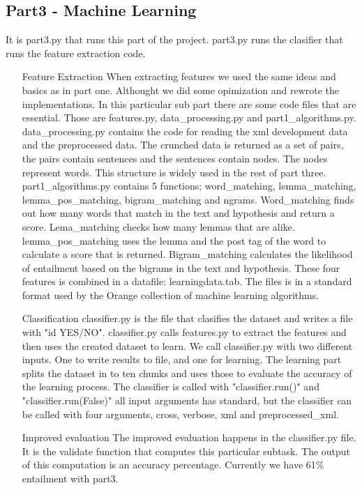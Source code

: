 \documentclass[titlepage]{article}
\begin{document}
\subsection{Part3 - Machine Learning}
It is part3.py that runs this part of the project. part3.py runs the clasifier that runs the feature extraction code. 
    \begin{itemize}
        \item[Feature Extraction] 
When extracting features we used the same ideas and basics as in part one. Althought we did some opimization and rewrote the implementations. In this particular sub part there are some code files that are essential. Those are features.py, data\_processing.py and part1\_algorithms.py. data\_processing.py contains the code for reading the xml development data and the preprocessed data. The crunched data is returned as a set of pairs, the pairs contain sentences and the sentences contain nodes. The nodes represent words. This structure is widely used in the rest of part three. part1\_algorithms.py contains 5 functions; word\_matching, lemma\_matching, lemma\_pos\_matching, bigram\_matching and ngrams. Word\_matching finds out how many words that match in the text and hypothesis and return a score. Lema\_matching checks how many lemmas that are alike. lemma\_pos\_matching uses the lemma and the post tag of the word to calculate a score that is returned. Bigram\_matching calculates the likelihood of entailment based on the bigrams in the text and hypothesis. These four features is combined in a datafile: learningdata.tab. The files is in a standard format used by the Orange collection of machine learning algorithms.
        \item[Classification]
classifier.py is the file that clasifies the dataset and writes a file with "id YES/NO". classifier.py calls features.py to extract the features and then uses the created dataset to learn. We call classifier.py with two different inputs. One to write results to file, and one for learning. The learning part splits the dataset in to ten chunks and uses those to evaluate the accuracy of the learning process. The classifier is called with "classifier.run()" and "classifier.run(False)" all input arguments has standard, but the classifier can be called with four arguments, cross, verbose, xml and preprocessed\_xml.
        \item[Improved evaluation]
The improved evaluation happens in the classifier.py file. It is the validate function that computes this particular subtask. The output of this computation is an accuracy percentage. Currently we have 61\% entailment with part3. 
    \end{itemize}
\end{document}
